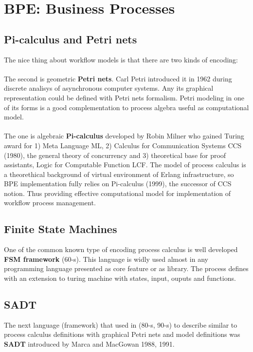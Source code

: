 \section{BPE: Business Processes}

\subsection{Pi-calculus and Petri nets}
The nice thing about workflow models is that there are two kinds of encoding:

\paragraph{}
The second is geometric {\bf Petri nets}. Carl Petri introduced it in 1962 during discrete
analisys of asynchronous computer systems. Any its graphical representation could be
defined with Petri nets formalism. Petri modeling in one of its forms is a good
complementation to process algebra useful as computational model.

\paragraph{}
The one is algebraic {\bf Pi-calculus} developed by Robin Milner who gained
Turing award for 1) Meta Language ML, 2) Calculus for Communication Systems CCS (1980),
the general theory of concurrency and 3) theoretical base for proof assistants,
Logic for Computable Function LCF.
The model of process calculus is a theorethical
background of virtual environment of Erlang infrastructure, so BPE
implementation fully relies on Pi-calculus (1999), the successor of CCS notion.
Thus providing effective computational model for implementation of workflow
process management.

\subsection{Finite State Machines}
One of the common known type of encoding process calculus is well developed {\bf FSM framework} (60-s).
This language is widly used almost in any programming language presented as core
feature or as library. The process defines with an extension to turing machine
with states, input, ouputs and functions.

\subsection{SADT}
The next language (framework) that used in (80-s, 90-s) to describe similar
to process calculus definitions with graphical Petri nets and model definitions
was {\bf SADT} introduced by Marca and MacGowan 1988, 1991.

